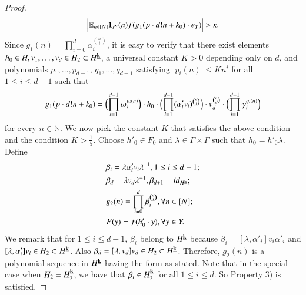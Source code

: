 \documentclass[12pt,amstex]{amsart}
\theoremstyle{definition}
\def \A {\alpha}
\def \B {\beta}
\def \D {\kappa}
\def \k {\bold{k}}
\begin{document}
\begin{proof}
   \begin{equation}\label{temp71}
    \begin{split}
     \Bigl\vert\mathbb{E}_{n\in[N]}\bold{1}_{P'}(n)f(g_{1}(p\cdot d!n+k_{0})\cdot e_{Y})\Bigr\vert>\D.
    \end{split}
  \end{equation}
  Since $g_{1}(n)=\prod_{i=0}^{d}\A_{i}^{\binom{n}{i}}$, it is easy to verify that there exist elements $h_{0}\in H, v_{1},\dots,v_{d}\in H_{2}\subset H^{\underline{\k}}$, a universal constant $K>0$ depending only on $d$, and polynomials $p_{1},\dots,p_{d-1}$, $q_{1},\dots,q_{d-1}$
  satisfying $\vert p_{i}(n)\vert\leq Kn^{i}$ for all $1\leq i\leq d-1$
such that
     \begin{equation}\label{temp51}
    \begin{split}
     g_{1}(p\cdot d!n+k_{0})=\Bigl(\prod_{i=1}^{d-1}\omega_{i}^{p_{i}(n)}\Bigr)\cdot h_{0}\cdot\Bigl(\prod_{i=1}^{d-1}(\A'_{i}v_{i})^{\binom{n}{i}}\Bigr)\cdot v_{d}^{\binom{n}{d}}\cdot\Bigl(\prod_{i=1}^{d-1}\gamma_{i}^{q_{i}(n)}\Bigr)
    \end{split}
  \end{equation}
  for every $n\in\mathbb{N}$.
  We now pick the constant $K$ that satisfies the above condition and the condition $K>\frac{1}{5}$.
   Choose $h'_{0}\in F_{0}$ and $\lambda\in\Gamma\times\Gamma$ such that $h_{0}=h'_{0}\lambda$. Define
    \begin{equation}\label{temp61}
    \begin{split}
     & \B_{i}=\lambda\A'_{i} v_{i}\lambda^{-1}, 1\leq i\leq d-1;
     \\& \B_{d}=\lambda v_{d}\lambda^{-1}, \B_{d+1}=id_{H^{\underline{\k}}};
     \\& g_{2}(n)=\prod_{i=0}^{d}\B_{i}^{\binom{n}{i}}, \forall n\in[N];
     \\& F(y)=f(h_{0}'\cdot y), \forall y\in Y.
    \end{split}
  \end{equation}
  We remark that for $1\leq i\leq d-1$, $\B_{i}$ belong to $H^{\underline{\k}}$ because
  $\B_{i}=[\lambda,\A'_{i}]v_{i}\A'_{i}$ and  $[\lambda,\A'_{i}]v_{i}\in H_{2}\subset H^{\underline{\k}}$. Also $\B_{d}=[\lambda,v_{d}]v_{d}\in H_{2}\subset H^{\underline{\k}}$.
Therefore, $g_{2}(n)$ is a polynomial sequence in $H^{\underline{\k}}$ having the form as stated.
Note that in the special case when $H_{2}=H_{2}^{\underline{\k}}$, we have that $\B_{i}\in H_{2}^{\underline{\k}}$ for all $1\leq i\leq d$. So Property 3) is satisfied.


\end{proof}
\end{document}
